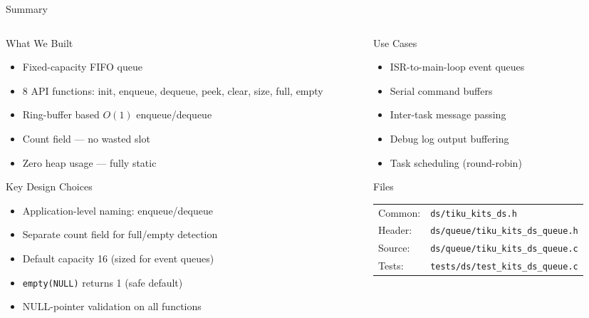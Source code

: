 \documentclass[aspectratio=169, 10pt]{beamer}
\begin{document}
\begin{frame}{Summary}
\begin{columns}[T]
\begin{column}{0.48\textwidth}
\begin{block}{What We Built}
\begin{itemize}
  \item Fixed-capacity FIFO queue
  \item 8 API functions: init, enqueue, dequeue, peek, clear, size, full, empty
  \item Ring-buffer based $O(1)$ enqueue/dequeue
  \item Count field --- no wasted slot
  \item Zero heap usage --- fully static
\end{itemize}
\end{block}

\begin{block}{Key Design Choices}
\begin{itemize}
  \item Application-level naming: enqueue/dequeue
  \item Separate count field for full/empty detection
  \item Default capacity 16 (sized for event queues)
  \item \texttt{empty(NULL)} returns 1 (safe default)
  \item NULL-pointer validation on all functions
\end{itemize}
\end{block}
\end{column}

\begin{column}{0.48\textwidth}
\begin{block}{Use Cases}
\begin{itemize}
  \item ISR-to-main-loop event queues
  \item Serial command buffers
  \item Inter-task message passing
  \item Debug log output buffering
  \item Task scheduling (round-robin)
\end{itemize}
\end{block}

\begin{block}{Files}
\scriptsize
\begin{tabular}{@{}lp{4.5cm}@{}}
Common: & \texttt{ds/tiku\_kits\_ds.h} \\
Header: & \texttt{ds/queue/tiku\_kits\_ds\_queue.h} \\
Source: & \texttt{ds/queue/tiku\_kits\_ds\_queue.c} \\
Tests:  & \texttt{tests/ds/test\_kits\_ds\_queue.c} \\
\end{tabular}
\end{block}
\end{column}
\end{columns}
\end{frame}
\end{document}
